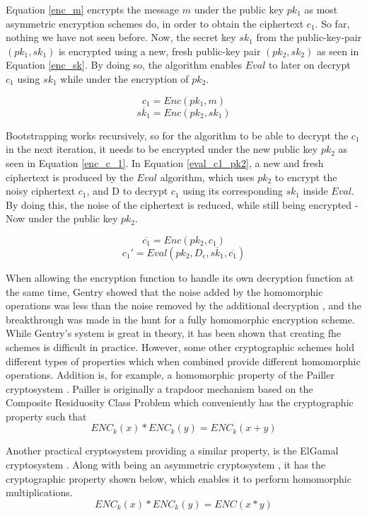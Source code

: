 Equation \ref{enc_m} encrypts the message $m$ under the public key $pk_1$ as most asymmetric encryption schemes do, in order to obtain the ciphertext $c_1$. So far, nothing we have not seen before. Now, the secret key $sk_1$ from the public-key-pair $(pk_1,sk_1)$ is encrypted using a new, fresh public-key pair $(pk_2, sk_2)$ as seen in Equation \ref{enc_sk}. By doing so, the algorithm enables $Eval$ to later on decrypt $c_1$ using $sk_1$ while under the encryption of $pk_2$.

\begin{equation}
\label{enc_m}
c_1 = Enc(pk_1, m)
\end{equation}
\begin{equation}
\label{enc_sk}
\overline{sk_1} = Enc(pk_2, sk_1)
\end{equation}

Bootstrapping works recursively, so for the algorithm to be able to decrypt the $c_1$ in the next iteration, it needs to be encrypted under the new public key $pk_2$ as seen in Equation \ref{enc_c_1}. In Equation \ref{eval_c1_pk2}, a new and fresh ciphertext is produced by the $Eval$ algorithm, which uses $pk_2$ to encrypt the noisy ciphertext $c_1$, and D to decrypt $c_1$ using its corresponding $sk_1$ inside $Eval$. By doing this, the noise of the ciphertext is reduced, while still being encrypted - Now under the public key $pk_2$. 

\begin{equation}
\label{enc_c_1}
\overline{c_1} = Enc(pk_2, c_1)
\end{equation}
\begin{equation}
\label{eval_c1_pk2}
c_1' = Eval(pk_2, D_{\epsilon}, \overline{sk_1}, \overline{c_1})
\end{equation}

When allowing the encryption function to handle its own decryption function at the same time, Gentry showed that the noise added by the homomorphic operations was less than the noise removed by the additional decryption \cite{Gentry_computing_arb_func_enc_data}, and the breakthrough was made in the hunt for a fully homomorphic encryption scheme. While Gentry's system is great in theory, it has been shown that creating \gls{fhe} schemes is difficult in practice. However, some other cryptographic schemes hold different types of properties which when combined provide different homomorphic operations. Addition is, for example, a homomorphic property of the Pailler cryptosystem \citep{Paillier}. Pailler is originally a trapdoor mechanism based on the Composite Residuosity Class Problem which conveniently has the cryptographic property such that \[ENC_k(x) * ENC_k(y) = ENC_k(x + y)\]

Another practical cryptosystem providing a similar property, is the ElGamal cryptosystem \cite{elgamal}. Along with being an asymmetric cryptosystem , it has the cryptographic property shown below, which enables it to perform homomorphic multiplications.  \[ENC_k(x) * ENC_k(y) = ENC(x * y)\]


